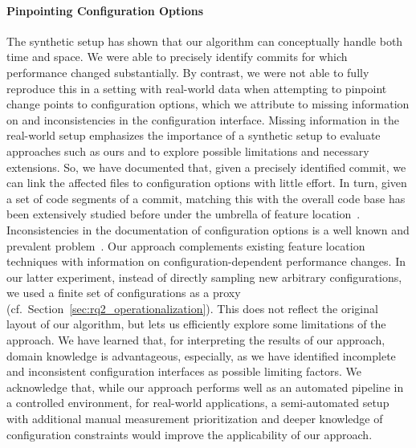 \documentclass[sigconf, screen]{acmart}
\begin{document}
	\paragraph{Pinpointing Configuration Options}
	The synthetic setup has shown that our algorithm can conceptually handle both time and space. We were able to precisely identify commits for which performance changed substantially. By contrast, we were not able to fully reproduce this in a setting with real-world data when attempting to pinpoint change points to configuration options, which we attribute to missing information on and inconsistencies in the configuration interface.
	Missing information in the real-world setup emphasizes the importance of a synthetic setup to evaluate approaches such as ours and to explore possible limitations and necessary extensions. So, we have documented that, given a precisely identified commit, we can link the affected files to configuration options with little effort. In turn, given a set of code segments of a commit, matching this with the overall code base has been extensively studied before under the umbrella of feature location~\cite{hill_which_2013}. Inconsistencies in the documentation of configuration options is a well known and prevalent problem~\cite{rabkin_static_2011}. 
	Our approach complements existing feature location techniques with information on configuration-dependent performance changes. 	
	In our latter experiment, instead of directly sampling new arbitrary configurations, we used a finite set of configurations as a proxy (cf.~Section~\ref{sec:rq2_operationalization}). This does not reflect the original layout of our algorithm, but lets us efficiently explore some limitations of the approach. We have learned that, for interpreting the results of our approach, domain knowledge is advantageous, especially, as we have identified incomplete and inconsistent configuration interfaces as possible limiting factors. We acknowledge that, while our approach performs well as an automated pipeline in a controlled environment, for real-world applications, a semi-automated setup with additional manual measurement prioritization and deeper knowledge of configuration constraints would improve the applicability of our approach. 
	
\end{document}
